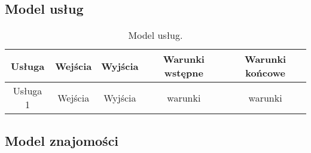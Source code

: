 \subsection{Model usług}

\begin{table}[!h] \label{tab:modeluslug} \centering
\caption{Model usług.}
\begin{tabular} {| c | c | c | c | c |} \hline
    Usługa & Wejścia & Wyjścia & Warunki wstępne & Warunki końcowe \\ \hline
    Usługa 1 & Wejścia & Wyjścia & warunki & warunki \\ \hline
\end{tabular}
\end{table}

\subsection{Model znajomości}
